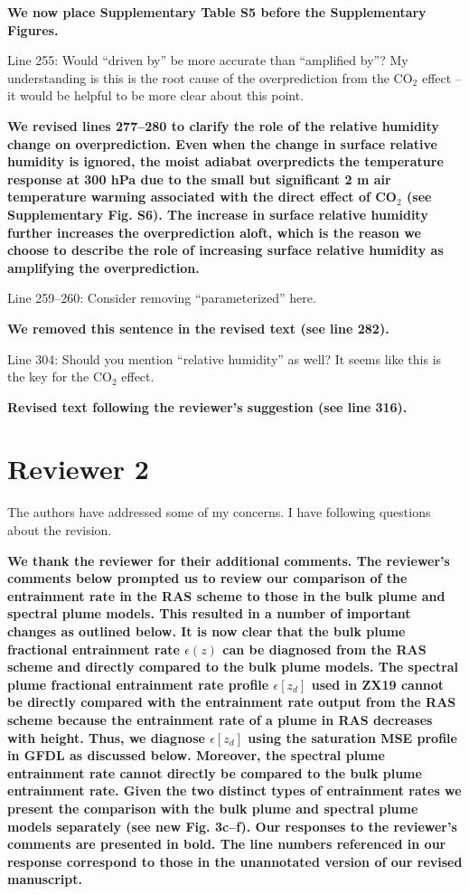 \documentclass[11pt]{article}
\begin{document}
\textbf{We now place Supplementary Table S5 before the Supplementary Figures.}

Line 255: Would ``driven by'' be more accurate than ``amplified by''? My understanding is this is the root cause of the overprediction from the CO\(_2\) effect -- it would be helpful to be more clear about this point.

\textbf{We revised lines 277--280 to clarify the role of the relative humidity change on overprediction. Even when the change in surface relative humidity is ignored, the moist adiabat overpredicts the temperature response at 300 hPa due to the small but significant 2 m air temperature warming associated with the direct effect of CO\(_2\) (see Supplementary Fig. S6). The increase in surface relative humidity further increases the overprediction aloft, which is the reason we choose to describe the role of increasing surface relative humidity as amplifying the overprediction.}

Line 259--260: Consider removing ``parameterized'' here.

\textbf{We removed this sentence in the revised text (see line 282).}

Line 304: Should you mention ``relative humidity'' as well? It seems like this is the key for the CO\(_2\) effect.

\textbf{Revised text following the reviewer's suggestion (see line 316).}

\clearpage
\section*{Reviewer 2}
\label{sec:orgd73312e}
The authors have addressed some of my concerns. I have following questions about the revision.

\textbf{We thank the reviewer for their additional comments. The reviewer's comments below prompted us to review our comparison of the entrainment rate in the RAS scheme to those in the bulk plume and spectral plume models. This resulted in a number of important changes as outlined below. It is now clear that the bulk plume fractional entrainment rate $\epsilon(z)$ can be diagnosed from the RAS scheme and directly compared to the bulk plume models. The spectral plume fractional entrainment rate profile $\epsilon[z_d]$ used in ZX19 cannot be directly compared with the entrainment rate output from the RAS scheme because the entrainment rate of a plume in RAS decreases with height. Thus, we diagnose $\epsilon[z_d]$ using the saturation MSE profile in GFDL as discussed below. Moreover, the spectral plume entrainment rate cannot directly be compared to the bulk plume entrainment rate. Given the two distinct types of entrainment rates we present the comparison with the bulk plume and spectral plume models separately (see new Fig. 3c--f). Our responses to the reviewer's comments are presented in bold. The line numbers referenced in our response correspond to those in the unannotated version of our revised manuscript.}
\end{document}
